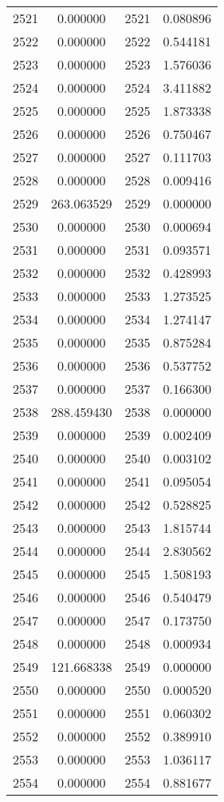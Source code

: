 \documentclass[12pt]{article}
\begin{document}
\begin{longtable}{@{}cccc@{}}
2521 & 0.000000 & 2521 & 0.080896 \\
2522 & 0.000000 & 2522 & 0.544181 \\
2523 & 0.000000 & 2523 & 1.576036 \\
2524 & 0.000000 & 2524 & 3.411882 \\
2525 & 0.000000 & 2525 & 1.873338 \\
2526 & 0.000000 & 2526 & 0.750467 \\
2527 & 0.000000 & 2527 & 0.111703 \\
2528 & 0.000000 & 2528 & 0.009416 \\
2529 & 263.063529 & 2529 & 0.000000 \\
2530 & 0.000000 & 2530 & 0.000694 \\
2531 & 0.000000 & 2531 & 0.093571 \\
2532 & 0.000000 & 2532 & 0.428993 \\
2533 & 0.000000 & 2533 & 1.273525 \\
2534 & 0.000000 & 2534 & 1.274147 \\
2535 & 0.000000 & 2535 & 0.875284 \\
2536 & 0.000000 & 2536 & 0.537752 \\
2537 & 0.000000 & 2537 & 0.166300 \\
2538 & 288.459430 & 2538 & 0.000000 \\
2539 & 0.000000 & 2539 & 0.002409 \\
2540 & 0.000000 & 2540 & 0.003102 \\
2541 & 0.000000 & 2541 & 0.095054 \\
2542 & 0.000000 & 2542 & 0.528825 \\
2543 & 0.000000 & 2543 & 1.815744 \\
2544 & 0.000000 & 2544 & 2.830562 \\
2545 & 0.000000 & 2545 & 1.508193 \\
2546 & 0.000000 & 2546 & 0.540479 \\
2547 & 0.000000 & 2547 & 0.173750 \\
2548 & 0.000000 & 2548 & 0.000934 \\
2549 & 121.668338 & 2549 & 0.000000 \\
2550 & 0.000000 & 2550 & 0.000520 \\
2551 & 0.000000 & 2551 & 0.060302 \\
2552 & 0.000000 & 2552 & 0.389910 \\
2553 & 0.000000 & 2553 & 1.036117 \\
2554 & 0.000000 & 2554 & 0.881677 \\

\end{longtable}
\end{document}
